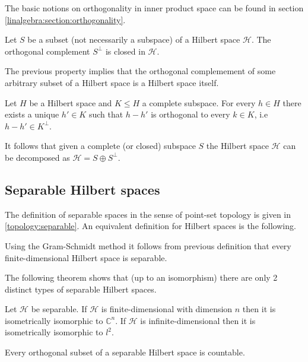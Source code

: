 	The basic notions on orthogonality in inner product space can be found in section \ref{linalgebra:section:orthogonality}.

	\begin{property}
		Let $S$ be a subset (not necessarily a subspace) of a Hilbert space $\mathcal{H}$. The orthogonal complement $S^\perp$ is closed in $\mathcal{H}$.
	\end{property}
	\begin{result}
		The previous property implies that the orthogonal complemement of some arbitrary subset of a Hilbert space is a Hilbert space itself.
	\end{result}
	
	\begin{theorem}
		\label{linalgebra:theorem:projection_theorem}
		Let $H$ be a Hilbert space and $K\leq H$ a complete subspace. For every $h\in H$ there exists a unique $h'\in K$ such that $h-h'$ is orthogonal to every $k\in K$, i.e $h-h'\in K^\perp$.
	\end{theorem}
	\begin{result}
		It follows that given a complete (or closed) subspace $S$ the Hilbert space $\mathcal{H}$ can be decomposed as $\mathcal{H} = S\oplus S^\perp$.
	\end{result}

\subsection{Separable Hilbert spaces}

	The definition of separable spaces in the sense of point-set topology is given in \ref{topology:separable}. An equivalent definition for Hilbert spaces is the following.
	\begin{result}
		Using the Gram-Schmidt method it follows from previous definition that every finite-dimensional Hilbert space is separable.
	\end{result}

	The following theorem shows that (up to an isomorphism) there are only 2 distinct types of separable Hilbert spaces.
	\begin{theorem}
		Let $\mathcal{H}$ be separable. If $\mathcal{H}$ is finite-dimensional with dimension $n$ then it is isometrically isomorphic to $\mathbb{C}^n$. If $\mathcal{H}$ is infinite-dimensional then it is isometrically isomorphic to $l^2$.
	\end{theorem}
	\begin{property}
		Every orthogonal subset of a separable Hilbert space is countable.
	\end{property}

